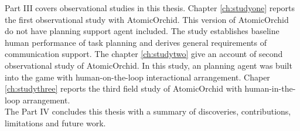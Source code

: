 Part III covers observational studies in this thesis. Chapter \ref{ch:studyone} reports the first observational study with AtomicOrchid. This version of AtomicOrchid do not have planning support agent included. The study establishes baseline human performance of task planning and derives general requirements of communication support. The chapter \ref{ch:studytwo} give an account of second observational study of AtomicOrchid. In this study, an planning agent was built into the game with human-on-the-loop interactional arrangement. Chaper \ref{ch:studythree} reports the third field study of AtomicOrchid with human-in-the-loop arrangement. \\ 

The Part IV concludes this thesis with a summary of discoveries, contributions, limitations and future work.\\










